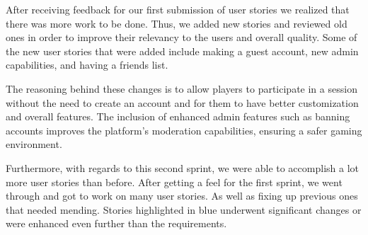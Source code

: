 After receiving feedback for our first submission of user stories we realized that there was more work to be done. Thus, we added new stories and reviewed old ones in order to improve their relevancy to the users and overall quality. Some of the new user stories that were added include making a guest account, new admin capabilities, and having a friends list. 

The reasoning behind these changes is to allow players to participate in a session without the need to create an account and for them to have better customization and overall features. The inclusion of enhanced admin features such as banning accounts improves the platform’s moderation capabilities, ensuring a safer gaming environment.

Furthermore, with regards to this second sprint, we were able to accomplish a lot more user stories than before. After getting a feel for the first sprint, we went through and got to work on many user stories. As well as fixing up previous ones that needed mending. Stories highlighted in blue underwent significant changes or were enhanced even further than the requirements.

\begin{table}[htbp]
\centering
{}
\caption{Delegation of user stories amongst group members}
\end{table}